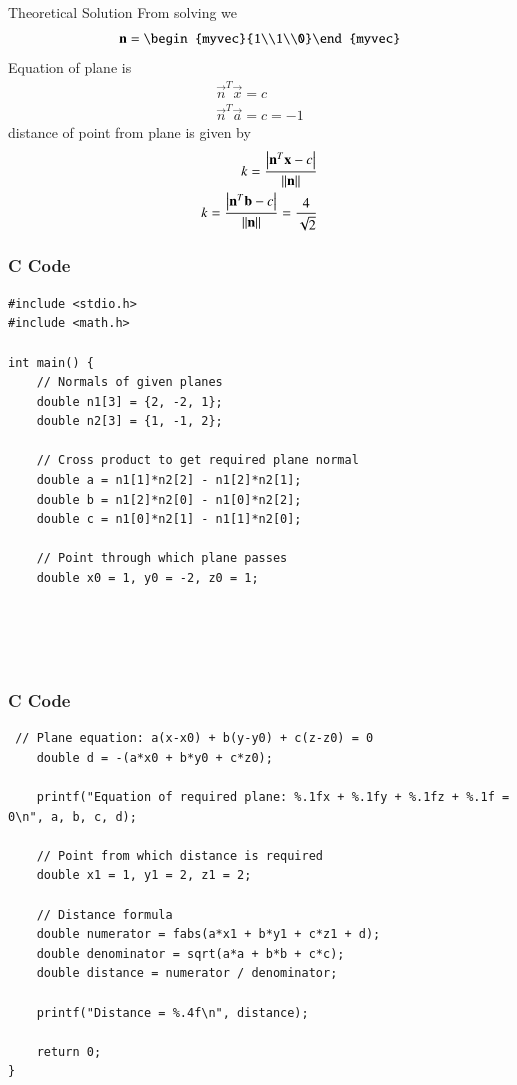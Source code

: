 \documentclass{beamer}
\begin{document}
\begin{frame}{Theoretical Solution}
From solving we
\begin{align}
\vec{n}=\begin{myvec}{1\\1\\0}\end{myvec}
\end{align}
Equation of plane is
\begin{align}
    \vec{n}^T\vec{x}=c\\
    \vec{n}^T\vec{a}=c=-1
\end{align}
distance of point from plane is given by\\
\begin{align}
   k=\frac{\left\vert\mathbf{n}^T\mathbf{x}-c\right\vert}{\|\mathbf{n}\|}\\
   k=\frac{\left\vert\mathbf{n}^T\mathbf{b}-c\right\vert}{\|\mathbf{n}\|}=\frac{4}{\sqrt{2}}
\end{align}
\end{frame}
\begin{frame}[fragile]
    \frametitle{C Code}

    \begin{lstlisting}
#include <stdio.h>
#include <math.h>

int main() {
    // Normals of given planes
    double n1[3] = {2, -2, 1};
    double n2[3] = {1, -1, 2};

    // Cross product to get required plane normal
    double a = n1[1]*n2[2] - n1[2]*n2[1];
    double b = n1[2]*n2[0] - n1[0]*n2[2];
    double c = n1[0]*n2[1] - n1[1]*n2[0];

    // Point through which plane passes
    double x0 = 1, y0 = -2, z0 = 1;

    

   

     \end{lstlisting}
\end{frame}
\begin{frame}[fragile]
    \frametitle{C Code }
    \begin{lstlisting}
 // Plane equation: a(x-x0) + b(y-y0) + c(z-z0) = 0
    double d = -(a*x0 + b*y0 + c*z0);

    printf("Equation of required plane: %.1fx + %.1fy + %.1fz + %.1f = 0\n", a, b, c, d);

    // Point from which distance is required
    double x1 = 1, y1 = 2, z1 = 2;

    // Distance formula
    double numerator = fabs(a*x1 + b*y1 + c*z1 + d);
    double denominator = sqrt(a*a + b*b + c*c);
    double distance = numerator / denominator;

    printf("Distance = %.4f\n", distance);

    return 0;
}
    \end{lstlisting}
\end{frame}
\end{document}
